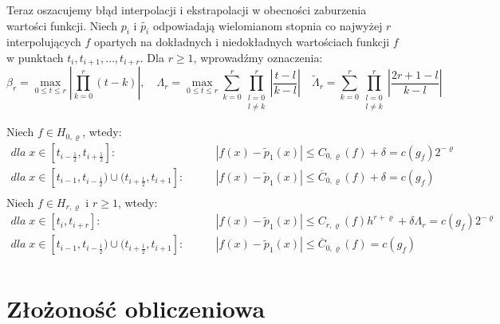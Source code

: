 \documentclass[oik, pdftex, robocza, man]{mgrwms}
\begin{document}
Teraz oszacujemy błąd interpolacji i ekstrapolacji w obecności zaburzenia wartości funkcji. Niech $p_{i}$ i $\tilde{p_{i}}$ odpowiadają wielomianom stopnia co najwyżej $r$ interpolujących $f$ opartych na dokładnych i niedokładnych wartościach funkcji $f$ w punktach $t_{i}, t_{i+1}, \dots, t_{i+r}$. Dla $r \geq 1$, wprowadźmy oznaczenia:
\begin{equation*}
    \beta_{r} = \max_{0 \leq t \leq r} |\prod_{k=0}^{r} (t-k)|, \quad
    \Lambda_{r} = \max_{0 \leq t \leq r} \sum_{k=0}^{r} \prod_{\substack{l=0 \\ l \neq k}}^{r} \left| \frac{t-l}{k-l} \right| \quad
    \tilde{\Lambda}_{r} = \sum_{k=0}^{r} \prod_{\substack{l=0 \\ l \neq k}}^{r} \left| \frac{2r+1-l}{k-l} \right|
\end{equation*}

\begin{lemma}
    Niech $f \in H_{0, \varrho}$, wtedy:
        \begin{align*}
            dla \; x \in [t_{i-\frac{1}{2}}, t_{i + \frac{1}{2}}] : & \qquad |f(x) - \tilde{p}_{1}(x)| \leq C_{0, \varrho}(f) + \delta= c(g_{f}) 2^{-\varrho} \\
            dla \; x \in [t_{i-1}, t_{i - \frac{1}{2}}) \cup (t_{i + \frac{1}{2}}, t_{i+1}]  : & \qquad |f(x) - \tilde{p}_{1}(x)| \leq \overline{C} _{0, \varrho}(f)  + \delta = c(g_{f}) \\
        \end{align*}    
    Niech $f \in H_{r, \varrho}$ i $r \geq 1$, wtedy:
        \begin{align*}
            dla \; x \in [t_{i}, t_{i + r}] : & \qquad |f(x) - \tilde{p}_{1}(x)| \leq C_{r, \varrho}(f) h^{r+\varrho} + \delta\Lambda_{r} = c(g_{f}) 2^{-\varrho} \\
            dla \; x \in [t_{i-1}, t_{i - \frac{1}{2}}) \cup (t_{i + \frac{1}{2}}, t_{i+1}]  : & \qquad |f(x) - \tilde{p}_{1}(x)| \leq \overline{C} _{0, \varrho}(f) = c(g_{f}) \\
        \end{align*}    
\end{lemma}

\mgrclosechapter


\chapter{Złożoność obliczeniowa}
\end{document}

